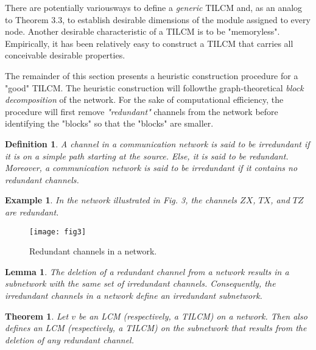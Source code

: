 \documentclass[journal]{IEEEtran}
\newtheorem{theo}[prop]{Theorem}
\newtheorem*{defi}{Definition}
\newtheorem{exam}[prop]{Example}
\newtheorem{lemm}[prop]{Lemma}
\begin{document}
\par
There are potentially variousways to define a \emph{generic} TILCM and, as an analog to Theorem 3.3, to establish desirable dimensions of the module assigned to every node. Another desirable characteristic of a TILCM is to be "memoryless". Empirically, it has been relatively easy to construct a TILCM that carries all conceivable desirable properties.
\par
The remainder of this section presents a heuristic construction procedure for a "good" TILCM. The heuristic construction will followthe graph-theoretical \emph{block decomposition} of the network. For the sake of computational efficiency, the procedure will first remove \emph{"redundant"} channels from the network before identifying the "blocks" so that the "blocks" are smaller.
\begin{defi}
	A channel in a communication network is said to be \emph{irredundant} if it is on a simple path starting at the source. Else, it is said to be \emph{redundant}. Moreover, a communication network is said to be \emph{irredundant} if it contains no redundant channels.
\end{defi}


\begin{exam}
	In the network illustrated in Fig. 3, the channels $ZX$, $TX$, and $TZ$ are redundant.
\end{exam}


\begin{figure}[H]
	\centering
	\texttt{[image: fig3]}
	\caption{Redundant channels in a network.}
	\label{fig3}
\end{figure}
\begin{lemm}
	The deletion of a redundant channel from a network 	results in a subnetwork with the same set of irredundant channels. Consequently, the irredundant channels in a network define an irredundant subnetwork.
\end{lemm}


\begin{theo}
	Let $v$ be an LCM (respectively, a TILCM) on a network. Then also defines an LCM (respectively, a TILCM) on the subnetwork that results from the deletion of any redundant channel.
\end{theo}
\end{document}
